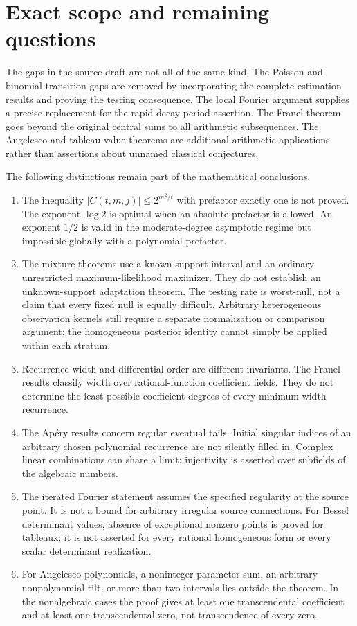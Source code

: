\documentclass[11pt,a4paper]{article}
\theoremstyle{definition}
\theoremstyle{remark}
\numberwithin{equation}{section}
\begin{document}
\clearpage

\section{Exact scope and remaining questions}
\label{p8:end:scope}

The gaps in the source draft are not all of the same kind. The Poisson
and binomial transition gaps are removed by incorporating the complete
estimation results and proving the testing consequence. The local Fourier
argument supplies a precise replacement for the rapid-decay period
assertion. The Franel theorem goes beyond the original central sums to
all arithmetic subsequences. The Angelesco and tableau-value theorems
are additional arithmetic applications rather than assertions about
unnamed classical conjectures.

The following distinctions remain part of the mathematical conclusions.
\begin{enumerate}[leftmargin=*]
\item The inequality $|C(t,m,j)|\le2^{m^2/t}$ with prefactor exactly
one is not proved. The exponent $\log2$ is optimal when an absolute
prefactor is allowed. An exponent $1/2$ is valid in the moderate-degree
asymptotic regime but impossible globally with a polynomial prefactor.
\item The mixture theorems use a known support interval and an ordinary
unrestricted maximum-likelihood maximizer. They do not establish an
unknown-support adaptation theorem. The testing rate is worst-null,
not a claim that every fixed null is equally difficult. Arbitrary
heterogeneous observation kernels still require a separate normalization
or comparison argument; the homogeneous posterior identity cannot simply
be applied within each stratum.
\item Recurrence width and differential order are different invariants.
The Franel results classify width over rational-function coefficient
fields. They do not determine the least possible coefficient degrees
of every minimum-width recurrence.
\item The Ap\'ery results concern regular eventual tails. Initial
singular indices of an arbitrary chosen polynomial recurrence are not
silently filled in. Complex linear combinations can share a limit;
injectivity is asserted over subfields of the algebraic numbers.
\item The iterated Fourier statement assumes the specified regularity
at the source point. It is not a bound for arbitrary irregular source
connections. For Bessel determinant values, absence of exceptional
nonzero points is proved for tableaux; it is not asserted for every
rational homogeneous form or every scalar determinant realization.
\item For Angelesco polynomials, a noninteger parameter sum, an
arbitrary nonpolynomial tilt, or more than two intervals lies outside
the theorem. In the nonalgebraic cases the proof gives at least one
transcendental coefficient and at least one transcendental zero, not
transcendence of every zero.
\end{enumerate}
\end{document}
